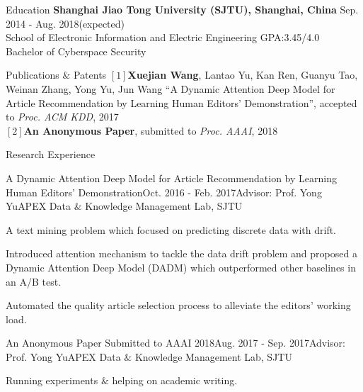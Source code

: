 \documentclass{resume} %
\begin{document}
\vspace{-1em}
\begin{rSection}{Education}
\textbf{Shanghai Jiao Tong University (SJTU), Shanghai, China} \hfill Sep. 2014 - Aug. 2018(expected)\\ %
School of Electronic Information and Electric Engineering  \hfill GPA:3.45/4.0 \\
Bachelor of Cyberspace Security
\end{rSection}

\begin{rSection}{Publications $\&$ Patents}
$[1]$\textbf{Xuejian Wang}, Lantao Yu, Kan Ren, Guanyu Tao, Weinan Zhang, Yong Yu, Jun Wang ``A Dynamic Attention Deep Model for Article Recommendation by Learning Human Editors’ Demonstration'', accepted to  \emph{Proc. ACM KDD}, 2017\\
$[2]$\textbf{An Anonymous Paper}, submitted to  \emph{Proc. AAAI}, 2018\\
\end{rSection}
\begin{rSection}{Research Experience}
\begin{rSubsection}{A Dynamic Attention Deep Model for Article Recommendation
by Learning Human Editors’ Demonstration}{Oct. 2016 - Feb. 2017}{Advisor: Prof. Yong Yu}{APEX Data $\&$ Knowledge Management Lab, SJTU}
\item A text mining problem which focused on predicting discrete data with drift.
\item Introduced attention mechanism to tackle the data drift problem and proposed a Dynamic Attention Deep Model (DADM) which outperformed other baselines in an A/B test.
\item Automated the quality article selection process to alleviate the editors' working load.
\end{rSubsection}
\begin{rSubsection}{An Anonymous Paper Submitted to AAAI 2018}{Aug. 2017 - Sep. 2017}{Advisor: Prof. Yong Yu}{APEX Data $\&$ Knowledge Management Lab, SJTU}
\item Running experiments $\&$ helping on academic writing.
\end{rSubsection}

\end{rSection}
\end{document}
